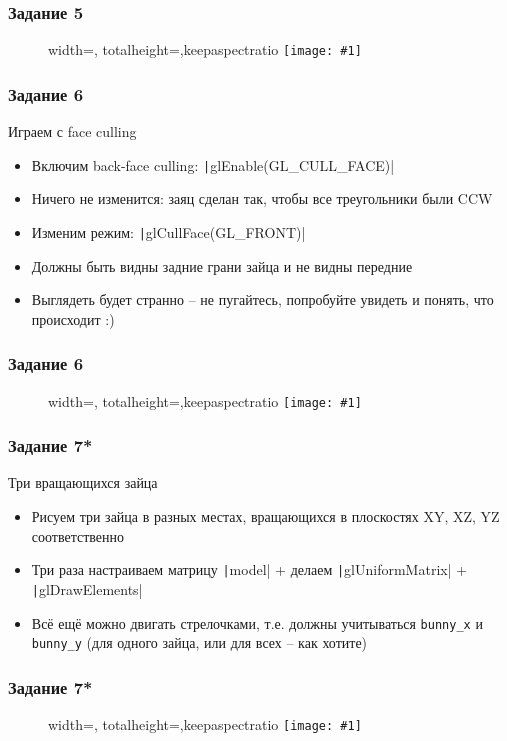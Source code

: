 \documentclass[10pt]{beamer}
\newcommand{\slideimage}[1]{
  \begin{figure}
    \begin{adjustbox}{width=\textwidth, totalheight=\textheight-2\baselineskip-2\baselineskip,keepaspectratio}
      \texttt{[image: \#1]}
    \end{adjustbox}
  \end{figure}
}
\begin{document}
\begin{frame}[fragile]
\frametitle{Задание 5}
\slideimage{5.png}
\end{frame}

\begin{frame}[fragile]
\frametitle{Задание 6}
Играем с face culling
\begin{itemize}
\item Включим back-face culling: \texttt|glEnable(GL_CULL_FACE)|
\item Ничего не изменится: заяц сделан так, чтобы все треугольники были CCW
\item Изменим режим: \texttt|glCullFace(GL_FRONT)|
\item Должны быть видны задние грани зайца и не видны передние
\item Выглядеть будет странно -- не пугайтесь, попробуйте увидеть и понять, что происходит :)
\end{itemize}
\end{frame}

\begin{frame}[fragile]
\frametitle{Задание 6}
\slideimage{6.png}
\end{frame}

\begin{frame}[fragile]
\frametitle{Задание 7*}
Три вращающихся зайца
\begin{itemize}
\item Рисуем три зайца в разных местах, вращающихся в плоскостях XY, XZ, YZ соответственно
\item Три раза настраиваем матрицу \texttt|model| + делаем \texttt|glUniformMatrix| + \texttt|glDrawElements|
\item Всё ещё можно двигать стрелочками, т.е. должны учитываться \verb|bunny_x| и \verb|bunny_y| (для одного зайца, или для всех -- как хотите)
\end{itemize}
\end{frame}

\begin{frame}[fragile]
\frametitle{Задание 7*}
\slideimage{7.png}
\end{frame}
\end{document}
